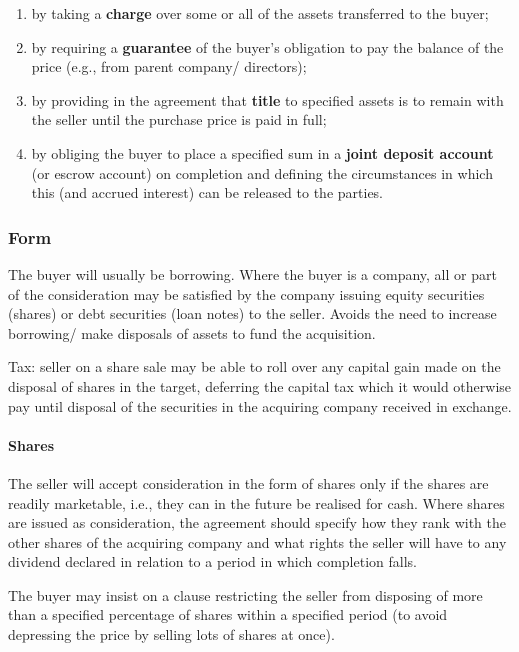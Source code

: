 \documentclass[
]{article}
\providecommand{\tightlist}{%
  \setlength{\itemsep}{0pt}\setlength{\parskip}{0pt}}
\begin{document}
\begin{enumerate}
\tightlist
\item
  by taking a \textbf{charge} over some or all of the assets transferred
  to the buyer;
\item
  by requiring a \textbf{guarantee} of the buyer's obligation to pay the
  balance of the price (e.g., from parent company/ directors);
\item
  by providing in the agreement that \textbf{title} to specified assets
  is to remain with the seller until the purchase price is paid in full;
\item
  by obliging the buyer to place a specified sum in a \textbf{joint
  deposit account} (or escrow account) on completion and defining the
  circumstances in which this (and accrued interest) can be released to
  the parties.
\end{enumerate}

\hypertarget{form}{%
\subsubsection{Form}\label{form}}

The buyer will usually be borrowing. Where the buyer is a company, all
or part of the consideration may be satisfied by the company issuing
equity securities (shares) or debt securities (loan notes) to the
seller. Avoids the need to increase borrowing/ make disposals of assets
to fund the acquisition.

Tax: seller on a share sale may be able to roll over any capital gain
made on the disposal of shares in the target, deferring the capital tax
which it would otherwise pay until disposal of the securities in the
acquiring company received in exchange.

\hypertarget{shares}{%
\paragraph{Shares}\label{shares}}

The seller will accept consideration in the form of shares only if the
shares are readily marketable, i.e., they can in the future be realised
for cash. Where shares are issued as consideration, the agreement should
specify how they rank with the other shares of the acquiring company and
what rights the seller will have to any dividend declared in relation to
a period in which completion falls.

The buyer may insist on a clause restricting the seller from disposing
of more than a specified percentage of shares within a specified period
(to avoid depressing the price by selling lots of shares at once).
\end{document}
